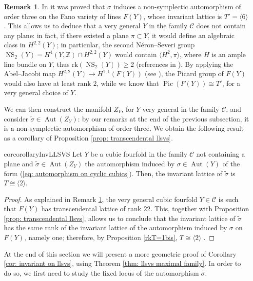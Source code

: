 \documentclass{amsart}
\theoremstyle{definition}
\newtheorem{rem}[theorem]{Remark}
\newcommand{\ra}{\rightarrow}
\newcommand{\IZ}{\mathbb{Z}}
\newcommand{\rk}{\mathrm{rk}}
\DeclareMathOperator{\aut}{Aut}
\DeclareMathOperator{\ns}{NS}
\DeclareMathOperator{\pic}{Pic}
\begin{document}
\begin{rem}\label{rem: cubic fourfold no planes}
In \cite[Example 6.4]{bcs} it was proved that $\sigma$ induces a non-symplectic automorphism of order three on the Fano variety of lines $F(Y)$, whose invariant lattice is $T' = \langle 6 \rangle$. This allows us to deduce that a very general $Y$ in the family $\mathcal{C}$ does not contain any plane: in fact, if there existed a plane $\pi \subset Y$, it would define an algebraic class in $H^{2,2}(Y)$; in particular, the second N\'eron--Severi group $\ns_2(Y) = H^4(Y, \IZ) \cap H^{2,2}(Y)$ would contain $\langle H^2, \pi\rangle$, where $H$ is an ample line bundle on $Y$, thus $\rk(\ns_2(Y)) \geq 2$ (references in \cite{macrì_stellari}). By applying the Abel--Jacobi map $H^{2,2}(Y) \ra H^{1,1}(F(Y))$ (see \cite{beauv_donagi}), the Picard group of $F(Y)$ would also have at least rank $2$, while we know that $\pic(F(Y)) \cong T'$, for a very general choice of $Y$. 
\end{rem}

We can then construct the manifold $Z_Y$, for $Y$ very general in the family $\mathcal{C}$, and consider $\tilde{\sigma} \in \aut(Z_Y)$: by our remarks at the end of the previous subsection, it is a non-symplectic automorphism of order three. We obtain the following result as a corollary of Proposition \ref{prop: transcendental llsvs}.

\begin{restatable}{cor}{corollaryInvLLSVS} \label{cor: invariant on llsvs}
Let $Y$ be a cubic fourfold in the family $\mathcal{C}$ not containing a plane and $\tilde{\sigma} \in \aut(Z_Y)$ the automorphism induced by $\sigma \in \aut(Y)$ of the form (\ref{eq: automorphism on cyclic cubics}). Then, the invariant lattice of $\tilde{\sigma}$ is $T \cong \langle 2 \rangle$.
\end{restatable}

\begin{proof}
As explained in Remark \ref{rem: cubic fourfold no planes}, the very general cubic fourfold $Y \in \mathcal{C}$ is such that $F(Y)$ has transcendental lattice of rank $22$. This, together with Proposition \ref{prop: transcendental llsvs}, allows us to conclude that the invariant lattice of $\tilde{\sigma}$ has the same rank of the invariant lattice of the automorphism induced by $\sigma$ on $F(Y)$, namely one; therefore, by Proposition \ref{rkT=1bis}, $T \cong \langle 2 \rangle$ .   
\end{proof}

At the end of this section we will present a more geometric proof of Corollary \ref{cor: invariant on llsvs}, using Theorem \ref{thm: llsvs maximal family}. In order to do so, we first need to study the fixed locus of the automorphism $\tilde{\sigma}$.
\end{document}
